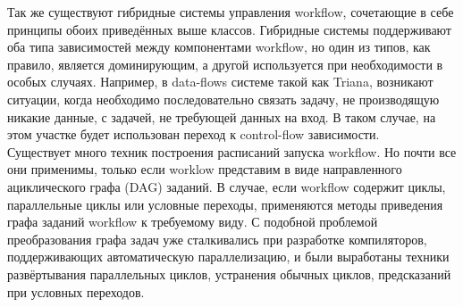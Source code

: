 \documentclass[a4paper,14pt]{article}
\begin{document}
  Так же существуют гибридные системы управления workflow, сочетающие в себе принципы обоих приведённых выше классов. Гибридные системы поддерживают оба типа зависимостей между компонентами workflow, но  один из типов, как правило, является доминирующим, а другой используется при необходимости  в особых случаях. Например, в data-flows системе такой как Triana, возникают ситуации, когда необходимо последовательно связать задачу, не производящую никакие данные, с задачей, не  требующей данных на вход. В таком случае, на этом участке будет использован переход к control-flow зависимости.\\
 
 
Существует много техник построения расписаний запуска workflow. Но почти все они применимы, только если worklow представим в виде направленного ациклического графа (DAG) заданий. В случае, если workflow содержит циклы, параллельные циклы или условные переходы, применяются методы приведения графа заданий workflow к требуемому виду. С подобной проблемой преобразования графа задач уже сталкивались при разработке компиляторов, поддерживающих автоматическую параллелизацию, и были выработаны техники развёртывания параллельных циклов, устранения обычных циклов, предсказаний при условных переходов.

 
\end{document}

